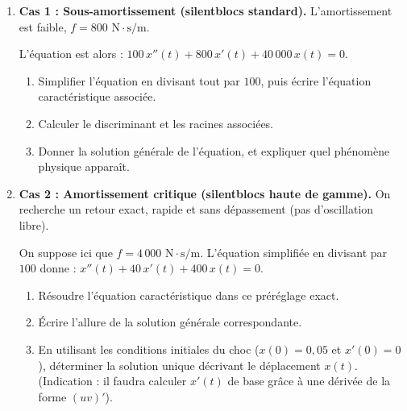 \documentclass[a4paper,11pt]{article}
\begin{document}
\begin{enumerate}
    \item \textbf{Cas 1 : Sous-amortissement (silentblocs standard).} L'amortissement est faible, $f = 800 \text{ N}\cdot\text{s/m}$.
    
       L'équation est alors : $100\,x''(t) + 800\,x'(t) + 40\,000\,x(t) = 0$.
       \begin{enumerate}
           \item Simplifier l'équation en divisant tout par $100$, puis écrire l'équation caractéristique associée.
           \vspace{1cm}
           \item Calculer le discriminant et les racines associées.
           \vspace{2.5cm}
           \item Donner la solution générale de l'équation, et expliquer quel phénomène physique apparaît.
           \vspace{2.5cm}
       \end{enumerate}
    
    \item \textbf{Cas 2 : Amortissement critique (silentblocs haute de gamme).} On recherche un retour exact, rapide et sans dépassement (pas d'oscillation libre).
    
       On suppose ici que $f = 4\,000 \text{ N}\cdot\text{s/m}$.
       L'équation simplifiée en divisant par $100$ donne : $x''(t) + 40\,x'(t) + 400\,x(t) = 0$.
       
       \begin{enumerate}
           \item Résoudre l'équation caractéristique dans ce préréglage exact.
           \vspace{2.5cm}
           \item Écrire l'allure de la solution générale correspondante.
           \vspace{2.5cm}
           \item En utilisant les conditions initiales du choc ($x(0) = 0,05$ et $x'(0) = 0$), déterminer la solution unique décrivant le déplacement $x(t)$. (Indication : il faudra calculer $x'(t)$ de base grâce à une dérivée de la forme $(uv)'$).
           \vspace{5cm}
       \end{enumerate}     
\end{enumerate}

\newpage

\end{document}
